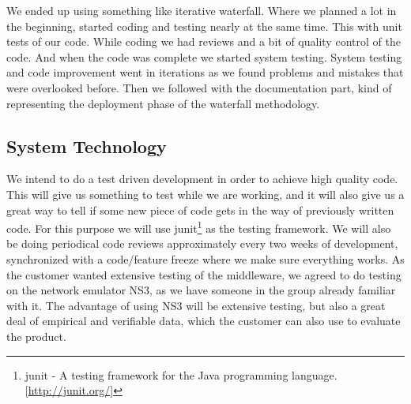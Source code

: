     We ended up using something like iterative waterfall. Where we planned a lot in the beginning, started coding and testing nearly at the same time. This with unit tests of our code. While coding we had reviews and a bit of quality control of the code. And when the code was complete we started system testing. System testing and code improvement went in iterations as we found problems and mistakes that were overlooked before. Then we followed with the documentation part, kind of representing the deployment phase of the waterfall methodology. 

    \subsection{System Technology}\label{System Technology}
    
    We  intend to do a test driven development in order to achieve high quality code. This will give us something to test while we are working, and it will also give us a great way to tell if some new piece of code gets in the way of previously written code. For this purpose we will use \gls{junit}\footnote{\gls{junit} - A testing framework for the Java programming language. [\url{http://junit.org/}]} as the testing framework. We will also be doing periodical code reviews approximately every two weeks of development, synchronized with a code/feature freeze where we make sure everything works. As the customer wanted extensive testing of the middleware, we agreed to do testing on the network emulator NS3, as we have someone in the group already familiar with it. The advantage of using NS3 will be extensive testing, but also a great deal of empirical and verifiable data, which the customer can also use to evaluate the product.

